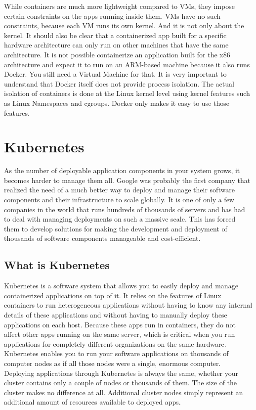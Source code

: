While containers are much more lightweight compared to VMs, they impose certain constraints on the apps running inside them. VMs have no such constraints, because each VM runs its own kernel.
And it is not only about the kernel. It should also be clear that a containerized app built for a specific hardware architecture can only run on other machines that have the same architecture. It is not possible containerize an application built for the x86 architecture and expect it to run on an ARM-based machine because it also runs Docker. You still need a Virtual Machine for that.
It is very important to understand that Docker itself does not provide process isolation. The actual isolation of containers is done at the Linux kernel level using kernel features such as Linux Namespaces and cgroups. Docker only makes it easy to use those features.


\section{Kubernetes} \label{sec:kubernetesbackground}
As the number of deployable application components in your system grows, it becomes harder to manage them all. Google was probably the first company that realized the need of a much better way to deploy and manage their software components and their infrastructure to scale globally. It is one of only a few companies in the world that runs hundreds of thousands of servers and has had to deal with managing deployments on such a massive scale. This has forced them to develop solutions for making the development and deployment of thousands of software components manageable and cost-efficient.


\subsection{What is Kubernetes}
Kubernetes is a software system that allows you to easily deploy and manage containerized applications on top of it. It relies on the features of Linux containers to run heterogeneous applications without having to know any internal details of these applications and without having to manually deploy these applications on each host. Because these apps run in containers, they do not affect other apps running on the same server, which is critical when you run applications for completely different organizations on the same hardware.
Kubernetes enables you to run your software applications on thousands of computer nodes as if all those nodes were a single, enormous computer.
Deploying applications through Kubernetes is always the same, whether your cluster contains only a couple of nodes or thousands of them. The size of the cluster makes no difference at all. Additional cluster nodes simply represent an additional amount of resources available to deployed apps.

